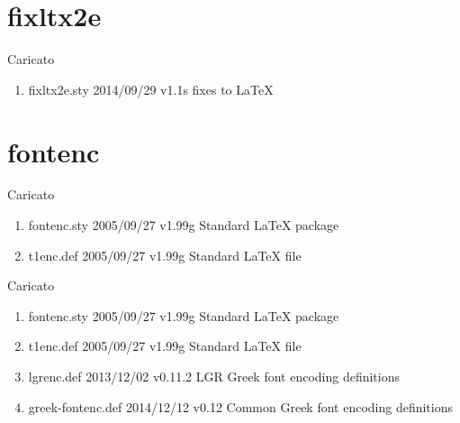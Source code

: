 \section{fixltx2e}

Caricato 
\begin{enumerate}
\item fixltx2e.sty 2014/09/29 v1.1s fixes to LaTeX
\end{enumerate} 
\section{fontenc}

Caricato 
\begin{enumerate}
\item fontenc.sty 2005/09/27 v1.99g Standard LaTeX package
\item t1enc.def 2005/09/27 v1.99g Standard LaTeX file
\end{enumerate}

Caricato 
\begin{enumerate}
\item fontenc.sty 2005/09/27 v1.99g Standard LaTeX package
\item t1enc.def 2005/09/27 v1.99g Standard LaTeX file
\item lgrenc.def 2013/12/02 v0.11.2 LGR Greek font encoding definitions
\item greek-fontenc.def 2014/12/12 v0.12 Common Greek font encoding definitions
\end{enumerate}
